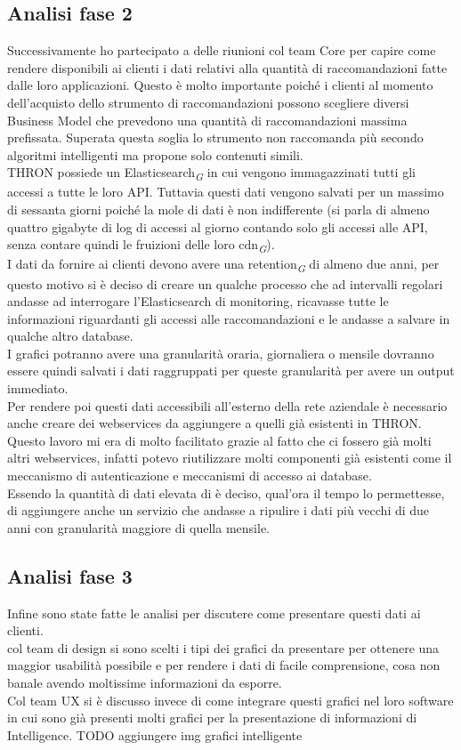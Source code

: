 \documentclass[a4paper, 12pt, twoside, openright]{book}
\newcommand{\gloss}[1]{#1\textsubscript{\textit{\tiny{G}}}}
\begin{document}
\subsection{Analisi fase 2}
Successivamente ho partecipato a delle riunioni col team Core per capire come rendere disponibili ai clienti i dati relativi alla quantità di raccomandazioni fatte dalle loro applicazioni. Questo è molto importante poiché i clienti al momento dell'acquisto dello strumento di raccomandazioni possono scegliere diversi Business Model che prevedono una quantità di raccomandazioni massima prefissata. Superata questa soglia lo strumento non raccomanda più secondo algoritmi intelligenti ma propone solo contenuti simili.\\
THRON possiede un \gloss{Elasticsearch} in cui vengono immagazzinati tutti gli accessi a tutte le loro API. Tuttavia questi dati vengono salvati per un massimo di sessanta giorni poiché la mole di dati è non indifferente (si parla di almeno quattro gigabyte di log di accessi al giorno contando solo gli accessi alle API, senza contare quindi le fruizioni delle loro \gloss{cdn}).\\I dati da fornire ai clienti devono avere una \gloss{retention} di almeno due anni, per questo motivo si è deciso di creare un qualche processo che ad intervalli regolari andasse ad interrogare l'Elasticsearch di monitoring, ricavasse tutte le informazioni riguardanti gli accessi alle raccomandazioni e le andasse a salvare in qualche altro database.\\I grafici potranno avere una granularità oraria, giornaliera o mensile dovranno essere quindi salvati i dati raggruppati per queste granularità per avere un output immediato.\\Per rendere poi questi dati accessibili all'esterno della rete aziendale è necessario anche creare dei webservices da aggiungere a quelli già esistenti in THRON. Questo lavoro mi era di molto facilitato grazie al fatto che ci fossero già molti altri webservices, infatti potevo riutilizzare molti componenti già esistenti come il meccanismo di autenticazione e meccanismi di accesso ai database.\\
Essendo la quantità di dati elevata di è deciso, qual'ora il tempo lo permettesse, di aggiungere anche un servizio che andasse a ripulire i dati più vecchi di due anni con granularità maggiore di quella mensile.

\subsection{Analisi fase 3}
Infine sono state fatte le analisi per discutere come presentare questi dati ai clienti.\\
col team di design si sono scelti i tipi dei grafici da presentare per ottenere una maggior usabilità possibile e per rendere i dati di facile comprensione, cosa non banale avendo moltissime informazioni da esporre.\\
Col team UX si è discusso invece di come integrare questi grafici nel loro software in cui sono già presenti molti grafici per la presentazione di informazioni di Intelligence. TODO aggiungere img grafici intelligente\\
\end{document}
